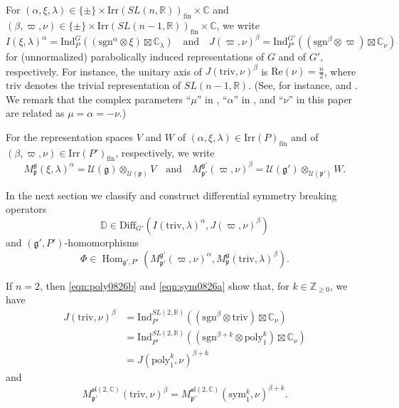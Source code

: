 \documentclass[reqno,11pt]{amsart}
\theoremstyle{remark}
\theoremstyle{definition}
\numberwithin{equation}{section}
\newcommand{\gb}{\beta}
\newcommand{\ga}{\alpha}
\newcommand{\fg}{{\mathfrak g}}
\newcommand{\fp}{{\mathfrak p}}
\newcommand{\f}{\mathfrak}
\newcommand{\R}{\mathbb{R}}
\newcommand{\C}{\mathbb{C}}
\newcommand{\Z}{\mathbb{Z}}
\newcommand{\Cal}{\mathcal}
\newcommand{\Hom}{\operatorname{Hom}}
\newcommand{\Ind}{\mathrm{Ind}}
\newcommand{\poly}{\mathrm{poly}}
\newcommand{\Diff}{\mathrm{Diff}}
\newcommand{\Irr}{\mathrm{Irr}}
\newcommand{\triv}{\mathrm{triv}}
\newcommand{\fin}{\mathrm{fin}}
\newcommand{\sym}{\mathrm{sym}}
\newcommand{\sgn}{\mathrm{sgn}}
\newcommand{\Mp}{M^{\fg}_{\fp}}
\newcommand{\Mpp}{M^{\fg'}_{\fp'}}
\newcommand{\bD}{\mathbb{D}}
\begin{document}
For 
$(\ga, \xi, \lambda) \in \{\pm\} \times \Irr(SL(n,\R))_{\fin} \times \C$
and
$(\gb, \varpi, \nu) \in \{\pm\} \times \Irr(SL(n-1,\R))_{\fin} \times \C$,
we write
\begin{equation}\label{eqn:Ind}
I(\xi,\lambda)^\ga 
= 
\Ind_{P}^G\left((\sgn^\ga \otimes \xi)\boxtimes \C_\lambda\right)
\quad
\text{and}
\quad
J(\varpi,\nu)^\gb 
= 
\Ind_{P'}^{G'}\left((\sgn^\gb \otimes \varpi)\boxtimes \C_\nu\right)
\end{equation}
for (unnormalized) parabolically induced representations 
of $G$ and of $G'$, respectively.
For instance, the unitary axis of 
$J(\triv, \nu)^\gb$ is $\text{Re}(\nu) = \frac{n}{2}$, 
where $\triv$ denotes the trivial representation of $SL(n-1,\R)$.
(See, for instance, \cite[p.\ 102]{vDM99} and \cite[p.\ 298]{HL99}. 
We remark that the complex parameters ``$\mu$'' in \cite{vDM99},
``$\alpha$'' in \cite{HL99}, and ``$\nu$'' in this paper are related as 
$\mu= \alpha = -\nu$.)

For the representation spaces $V$ and $W$
of 
$(\ga, \xi, \lambda) \in \Irr(P)_{\fin}$
and of $(\gb, \varpi, \nu) \in \Irr(P')_{\fin}$, respectively,
we write 
\begin{equation}\label{eqn:Verma}
\Mp(\xi,\lambda)^\ga 
=\Cal{U}(\fg) \otimes_{\Cal{U}(\fp)}V
\quad
\text{and}
\quad
\Mpp(\varpi,\nu)^\gb 
=\Cal{U}(\fg') \otimes_{\Cal{U}(\fp')}W.
\end{equation}

In the next section we classify and construct 
differential symmetry breaking operators
\begin{equation*}
\bD \in \Diff_{G'}(I(\triv, \lambda)^\ga, J(\varpi,  \nu)^\beta)
\end{equation*}
and $(\fg', P')$-homomorphisms
\begin{equation*}
\Phi \in \Hom_{\fg', P'}(\Mpp(\varpi,\nu)^\ga, \Mp(\triv, \lambda)^\gb).
\end{equation*}

If $n=2$, then \eqref{eqn:poly0826b} and \eqref{eqn:sym0826a} show that, 
for $k \in \Z_{\geq 0}$, we have
\begin{align}
J(\triv, \nu)^\beta
&=
\Ind_{P'}^{SL(2,\R)}\left((\sgn^\gb \otimes \triv)\boxtimes \C_\nu\right) \nonumber\\
&=
\Ind_{P'}^{SL(2,\R)}((\sgn^{\gb+k} \otimes \poly^k_1)\boxtimes \C_\nu)
\nonumber\\
&=
J(\poly^k_1, \nu)^{\beta+k} \label{eqn:poly0826c}
\end{align}
and
\begin{equation}\label{eqn:sym0826c}
M^{\f{sl}(2,\C)}_{\fp'}(\triv,\nu)^\gb
=
M^{\f{sl}(2,\C)}_{\fp'}(\sym^k_1,\nu)^{\gb+k}.
\end{equation}
\end{document}
